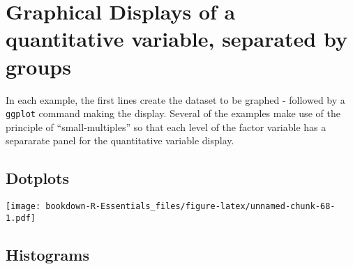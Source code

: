 \documentclass[]{book}
\newenvironment{Shaded}{\begin{snugshade}}{\end{snugshade}}
\newcommand{\KeywordTok}[1]{\textcolor[rgb]{0.13,0.29,0.53}{\textbf{#1}}}
\newcommand{\DataTypeTok}[1]{\textcolor[rgb]{0.13,0.29,0.53}{#1}}
\newcommand{\DecValTok}[1]{\textcolor[rgb]{0.00,0.00,0.81}{#1}}
\newcommand{\StringTok}[1]{\textcolor[rgb]{0.31,0.60,0.02}{#1}}
\newcommand{\CommentTok}[1]{\textcolor[rgb]{0.56,0.35,0.01}{\textit{#1}}}
\newcommand{\OperatorTok}[1]{\textcolor[rgb]{0.81,0.36,0.00}{\textbf{#1}}}
\newcommand{\NormalTok}[1]{#1}
\begin{document}
\section{Graphical Displays of a quantitative variable, separated by
groups}\label{graphical-displays-of-a-quantitative-variable-separated-by-groups}

In each example, the first lines create the dataset to be graphed -
followed by a \texttt{ggplot} command making the display. Several of the
examples make use of the principle of ``small-multiples'' so that each
level of the factor variable has a separarate panel for the quantitative
variable display.

\subsection{Dotplots}\label{dotplots}

\begin{Shaded}
\end{Shaded}

\texttt{[image: bookdown-R-Essentials\_files/figure-latex/unnamed-chunk-68-1.pdf]}

\subsection{Histograms}\label{histograms}
\end{document}
